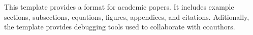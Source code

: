 

\noindent
This template provides a format for academic papers. 
%
It includes example sections, subsections, equations, figures, appendices, and citations.
%
Aditionally, the template provides debugging tools used to collaborate with coauthors.